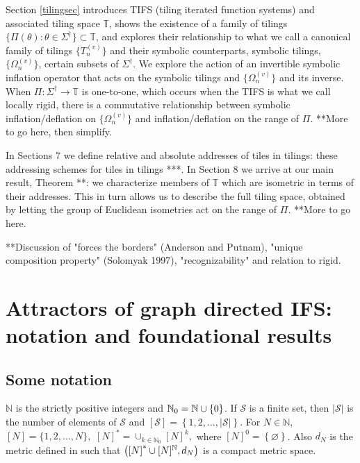 \documentclass{amsproc}
\theoremstyle{plain}
\theoremstyle{definition}
\numberwithin{equation}{section}
\begin{document}
Section \ref{tilingsec} introduces TIFS (tiling iterated function systems)
and associated tiling space $\mathbb{T}$, shows the existence of a family of
tilings $\{\Pi(\theta):\theta\in\Sigma^{\dag}\}\subset\mathbb{T}$, and
explores their relationship to what we call a canonical family of tilings $%
\{T_{n}^{(v)}\}$ and their symbolic counterparts, symbolic tilings, $%
\{\Omega_{n}^{(v)}\}$, certain subsets of $\Sigma^{\dag}$. We explore the
action of an invertible symbolic inflation operator that acts on the
symbolic tilings and $\{\Omega_{n}^{(v)}\}$ and its inverse. When $%
\Pi:\Sigma^{\dag }\rightarrow\mathbb{T}$ is one-to-one, which occurs when
the TIFS is what we call locally rigid, there is a commutative relationship
between symbolic inflation/deflation on $\{\Omega_{n}^{(v)}\}$ and
inflation/deflation on the range of $\Pi$. **More to go here, then simplify.

In Sections 7 we define relative and absolute addresses of tiles in tilings:
these addressing schemes for tiles in tilings ***. In Section 8 we arrive at
our main result, Theorem **: we characterize members of $\mathbb{T}$ which
are isometric in terms of their addresses. This in turn allows us to
describe the full tiling space, obtained by letting the group of Euclidean
isometries act on the range of $\Pi$. **More to go here.

**Discussion of "forces the borders" (Anderson and Putnam), "unique
composition property" (Solomyak 1997), "recognizability" and relation to
rigid.

\section{\label{sec:one}Attractors of graph directed IFS: notation and
foundational results}

\subsection{Some notation}

$\mathbb{N}$ is the strictly positive integers and $\mathbb{N}_{0}=\mathbb{%
N\cup\{}0\}$. If $\mathcal{S}$ is a finite set, then $\left\vert \mathcal{S}%
\right\vert $ is the number of elements of $\mathcal{S}$ and $\left[ 
\mathcal{S}\right] =\left\{ 1,2,...,\left\vert \mathcal{S}\right\vert
\right\} $. For $N\in\mathbb{N}$, $\left[ N\right] =\{1,2,...,N\},$ $\left[ N%
\right] ^{\ast}=\cup_{k\in\mathbb{N}_{0}}[N]^{k},$ where $[N]^{0}=\left\{
\varnothing\right\} $. Also $d_{N}$ is the metric defined in \cite%
{barnsleyvince} such that $\left( \left[ N\right] ^{\ast }\cup\lbrack N]^{%
\mathbb{N}},d_{N}\right) $ is a compact metric space.
\end{document}

